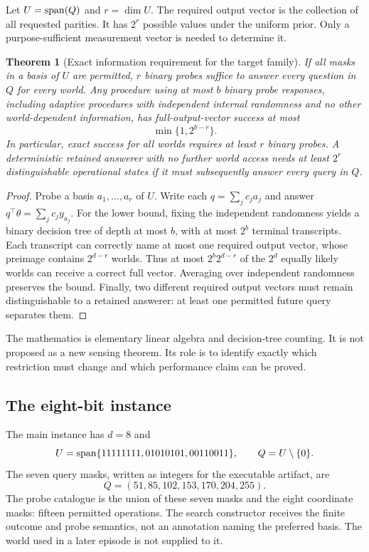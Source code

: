 \documentclass[11pt,letterpaper]{article}
\newtheorem{theorem}{Theorem}[section]
\theoremstyle{remark}\newtheorem{remark}{Remark}[section]
\begin{document}
Let $U=\operatorname{span}(Q)$ and $r=\dim U$. The required output vector is the collection of all requested parities. It has $2^r$ possible values under the uniform prior. Only a purpose-sufficient measurement vector is needed to determine it.

\begin{theorem}[Exact information requirement for the target family]\label{thm:rank}
If all masks in a basis of $U$ are permitted, $r$ binary probes suffice to answer every question in $Q$ for every world. Any procedure using at most $b$ binary probe responses, including adaptive procedures with independent internal randomness and no other world-dependent information, has full-output-vector success at most
\begin{equation}\label{eq:anybinary}
\min\{1,2^{b-r}\}.
\end{equation}
In particular, exact success for all worlds requires at least $r$ binary probes. A deterministic retained answerer with no further world access needs at least $2^r$ distinguishable operational states if it must subsequently answer every query in $Q$.
\end{theorem}
\begin{proof}
Probe a basis $a_1,\ldots,a_r$ of $U$. Write each $q=\sum_j c_j a_j$ and answer $q^\top\theta=\sum_j c_j y_{a_j}$. For the lower bound, fixing the independent randomness yields a binary decision tree of depth at most $b$, with at most $2^b$ terminal transcripts. Each transcript can correctly name at most one required output vector, whose preimage contains $2^{d-r}$ worlds. Thus at most $2^b2^{d-r}$ of the $2^d$ equally likely worlds can receive a correct full vector. Averaging over independent randomness preserves the bound. Finally, two different required output vectors must remain distinguishable to a retained answerer: at least one permitted future query separates them.
\end{proof}
The mathematics is elementary linear algebra and decision-tree counting. It is not proposed as a new sensing theorem. Its role is to identify exactly which restriction must change and which performance claim can be proved.

\subsection{The eight-bit instance}
The main instance has $d=8$ and
\begin{equation}\label{eq:basis}
 U=\operatorname{span}\{11111111,01010101,00110011\},\qquad Q=U\setminus\{0\}.
\end{equation}
The seven query masks, written as integers for the executable artifact, are
\begin{equation}
Q=(51,85,102,153,170,204,255).
\end{equation}
The probe catalogue is the union of these seven masks and the eight coordinate masks: fifteen permitted operations. The search constructor receives the finite outcome and probe semantics, not an annotation naming the preferred basis. The world used in a later episode is not supplied to it.
\end{document}
